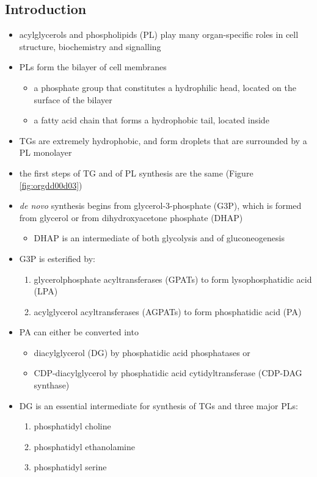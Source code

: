 \documentclass[12pt]{scrartcl}
\begin{document}
\subsection{Introduction}
\label{sec:org4583ea3}
\begin{itemize}
\item acylglycerols and phospholipids (PL) play many organ-specific roles
in cell structure, biochemistry and signalling
\item PLs form the bilayer of cell membranes
\begin{itemize}
\item a phosphate group that constitutes a hydrophilic head, located on the surface of the bilayer
\item a fatty acid chain that forms a hydrophobic tail, located inside
\end{itemize}
\item TGs are extremely hydrophobic, and form droplets
that are surrounded by a PL monolayer
\item the first steps of TG and of PL synthesis are the same (Figure \ref{fig:orgdd00d03})
\item \emph{de novo} synthesis begins from glycerol-3-phosphate (G3P), which is
formed from glycerol or from dihydroxyacetone phosphate (DHAP)
\begin{itemize}
\item DHAP is an intermediate of both glycolysis and of gluconeogenesis
\end{itemize}
\item G3P is esterified by:
\begin{enumerate}
\item glycerolphosphate acyltransferases (GPATs) to form lysophosphatidic acid (LPA)
\item acylglycerol acyltransferases (AGPATs) to form phosphatidic acid (PA)
\end{enumerate}
\item PA can either be converted into
\begin{itemize}
\item diacylglycerol (DG) by phosphatidic acid phosphatases or
\item CDP-diacylglycerol by phosphatidic acid cytidyltransferase (CDP-DAG synthase)
\end{itemize}
\item DG is an essential intermediate for synthesis of TGs and three major PLs:
\begin{enumerate}
\item phosphatidyl choline
\item phosphatidyl ethanolamine
\item phosphatidyl serine
\end{enumerate}
\end{itemize}
\end{document}
